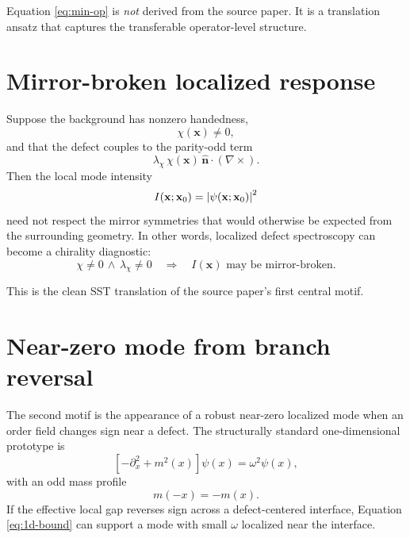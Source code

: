 \documentclass[11pt]{article}
\begin{document}
        Equation \eqref{eq:min-op} is \emph{not} derived from the source paper. It is a translation ansatz that captures the transferable operator-level structure.

    \section{Mirror-broken localized response}
        Suppose the background has nonzero handedness,
        \begin{equation}
            \chi(\mathbf{x}) \neq 0,
        \end{equation}
        and that the defect couples to the parity-odd term
        \begin{equation}
            \lambda_\chi\,\chi(\mathbf{x})\,\hat{\mathbf{n}}\cdot(\nabla\times).
        \end{equation}
        Then the local mode intensity
        \begin{equation}
            I(\mathbf{x};\mathbf{x}_0)=\abs{\psi(\mathbf{x};\mathbf{x}_0)}^2
        \end{equation}
        need not respect the mirror symmetries that would otherwise be expected from the surrounding geometry. In other words, localized defect spectroscopy can become a chirality diagnostic:
        \begin{equation}
            \chi \neq 0 \,\wedge\, \lambda_\chi\neq 0
            \quad\Longrightarrow\quad
            I(\mathbf{x}) \text{ may be mirror-broken.}
        \end{equation}

        This is the clean SST translation of the source paper's first central motif.

    \section{Near-zero mode from branch reversal}
        The second motif is the appearance of a robust near-zero localized mode when an order field changes sign near a defect. The structurally standard one-dimensional prototype is
        \begin{equation}
            \left[-\partial_x^2 + m^2(x)\right]\psi(x) = \omega^2\psi(x),
            \label{eq:1d-bound}
        \end{equation}
        with an odd mass profile
        \begin{equation}
            m(-x)=-m(x).
        \end{equation}
        If the effective local gap reverses sign across a defect-centered interface, Equation \eqref{eq:1d-bound} can support a mode with small $\omega$ localized near the interface.
\end{document}
